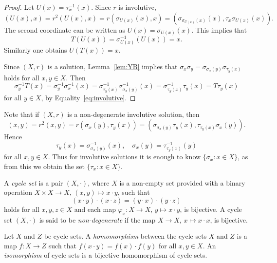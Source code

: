 \begin{proof}
Let $U(x)=\tau_x^{-1}(x)$. Since $r$ is involutive, 
\[
(U(x),x)=r^2(U(x),x)=r(\sigma_{U(x)}(x),x)=(\sigma_{\sigma_{U(x)}(x)}(x),\tau_x\sigma_{U(x)}(x)).
\]
The second coordinate can be written as $U(x)=\sigma_{U(x)}(x)$. This 
implies that 
\[
T(U(x))=\sigma^{-1}_{U(x)}(U(x))=x.
\]
Similarly one obtains $U(T(x))=x$. 

Since $(X,r)$ is a solution, Lemma~\ref{lem:YB} implies that 
$\sigma_x\sigma_y=\sigma_{\sigma_x(y)}\sigma_{\tau_y(x)}$
holds for all $x,y\in X$. Then  
\[
\sigma_y^{-1}T(x)
=\sigma_y^{-1}\sigma_x^{-1}(x)
=\sigma^{-1}_{\tau_y(x)}\sigma^{-1}_{\sigma_x(y)}(x)
=\sigma^{-1}_{\tau_y(x)}\tau_y(x)
=T\tau_y(x)
\]
for all $y\in X$, by Equality~\eqref{eq:involutive}.
\end{proof}

Note that if $(X,r)$ is a non-degenerate involutive solution, then 
\[
(x,y)=r^2(x,y)=r(\sigma_x(y),\tau_y(x))=(\sigma_{\sigma_x(y)}\tau_y(x),\tau_{\tau_y(x)}\sigma_x(y)).
\]
Hence 
\begin{equation}
    \label{eq:involutive}
    \tau_y(x)=\sigma_{\sigma_x(y)}^{-1}(x),
    \quad
    \sigma_x(y)=\tau_{\tau_y(x)}^{-1}(y)
\end{equation}
for all $x,y\in X$. Thus for involutive solutions
it is enough to know $\{\sigma_x:x\in X\}$, as from this we obtain the
set $\{\tau_x:x\in X\}$. 


\begin{definition}
A \emph{cycle set} is a pair $(X,\cdot)$, where $X$ is a non-empty 
set provided with a binary operation $X\times X\to X$, $(x,y)\mapsto x\cdot y$, 
such that 
\begin{equation}
    \label{eq:cycle_set}
    (x\cdot y)\cdot (x\cdot z)=(y\cdot x)\cdot (y\cdot z)
\end{equation}
holds for all $x,y,z\in X$ and each map $\varphi_x\colon X\to X$, $y\mapsto x\cdot y$, is bijective. 
A cycle set $(X,\cdot)$ is said to be \emph{non-degenerate} 
if the map $X\to X$, $x\mapsto x\cdot x$, is bijective. 
\end{definition}

\begin{definition}
Let $X$ and $Z$ be cycle sets. 
A \emph{homomorphism} between the cycle sets $X$ and $Z$ is a 
map $f\colon X\to Z$ such that $f(x\cdot y)=f(x)\cdot f(y)$ for all $x,y\in X$. An \emph{isomorphism} of cycle sets
is a bijective homomorphism of cycle sets. 
\end{definition}

